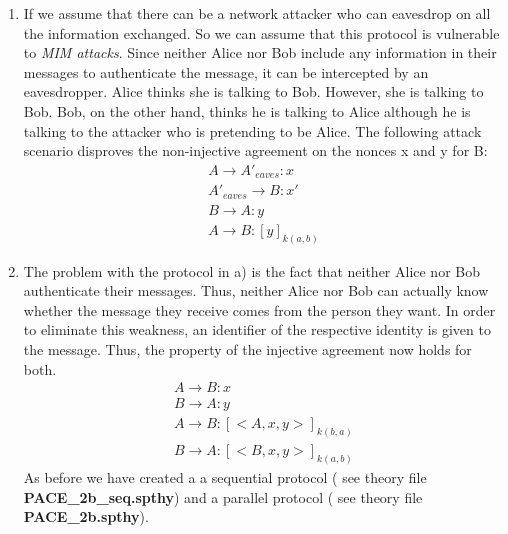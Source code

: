 \documentclass[a4paper,11pt]{scrartcl}
\begin{document}
\begin{enumerate}[label=\alph*)]
	\item If we assume that there can be a network attacker who can eavesdrop on all the information exchanged.  So we can assume that this protocol is vulnerable to \textit{
	MIM attacks}. Since neither Alice nor Bob include any information in their messages to authenticate the message, it can be intercepted by an eavesdropper. Alice thinks she is    	talking to Bob. However, she is talking to Bob.  Bob, on the other hand, thinks he is talking to Alice although he is talking to the attacker who is pretending to be Alice.
	The following attack scenario disproves the non-injective agreement on the nonces x and y for  B:
	\begin{align*}
	A \rightarrow A'_{eaves}: x\\
	A'_{eaves} \rightarrow B: x'\\
	B \rightarrow A : y\\
	A \rightarrow B : [y]_{k(a,b)}
	\end{align*}
	\item The problem with the protocol in a) is the fact that neither Alice nor Bob authenticate their messages. Thus, neither Alice nor Bob can actually know whether the	    				message they receive comes from the person they want.  In order to eliminate this weakness, an identifier of the respective identity is given to the message. Thus, the property 		of the injective agreement now holds for both.
	\begin{align*}
	A \rightarrow B: x\\
	B \rightarrow A: y\\
	A \rightarrow B: [<A, x, y>]_{k(b,a)}\\
	B \rightarrow A: [<B, x, y>]_{k(a,b)}
	\end{align*}
	As before we have created a a sequential protocol ( see theory file \textbf{PACE_2b_seq.spthy}) and a parallel protocol ( see theory file \textbf{PACE_2b.spthy}).
\end{enumerate}
\end{document}
